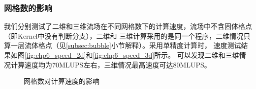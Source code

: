 \subsubsection{网格数的影响}
我们分别测试了二维和三维流场在不同网格数下的计算速度，流场中不含固体格点（即Kernel中没有判断分支），二维和
三维计算采用的是同一个程序，二维情况只算一层流体格点（见\ref{subsec:bubble}小节解释）。采用单精度计算时，
速度测试结果如图\ref{fig:chp6_speed_2d}和\ref{fig:chp6_speed_3d}所示。
可以发现二维和三维情况计算速度均为70MLUPS左右，三维情况最高速度可达80MLUPS。
\begin{figure}[htpb]
  \centering
  \caption{网格数对计算速度的影响}
\end{figure}

